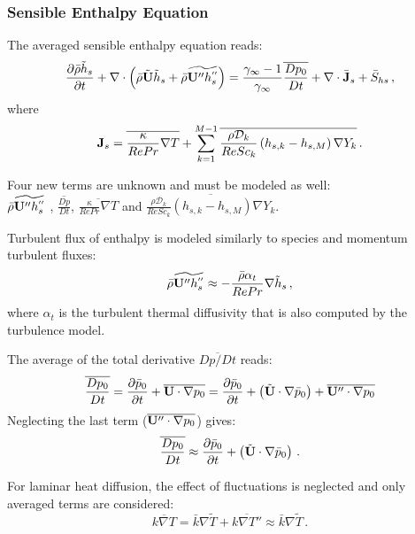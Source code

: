 \subsubsection{Sensible Enthalpy Equation}
The averaged sensible enthalpy equation reads:
\begin{equation}
\frac{\partial \bar{\rho} \tilde{h}_{s}}{\partial t} + \nabla \cdot
\left(\bar{\rho} \tilde{\mathbf{U}} \tilde{h}_{s} + \bar{\rho} \widetilde{\mathbf{U}''
h_s^{''}} \right) = \frac{\gamma_{\infty} -1}{\gamma_{\infty}}\overline{\frac{Dp_0}{Dt}} + \nabla
\cdot \bar{\mathbf{J}}_s + \bar{S}_{hs}\, ,
\end{equation} where 
\begin{equation}
\mathbf{J}_s =  \overline{\frac{\kappa}{Re Pr} \nabla T} + \sum_{k=1}^{M-1}
\overline{\frac{\rho\mathcal{D}_k}{Re Sc_k} \left( h_{s,k} -h_{s,M} \right)
\nabla Y_{k}} \, . 
\end{equation}

Four new terms are unknown and must be modeled as well:\\  $\bar{\rho}
\widetilde{\mathbf{U}'' h_s^{''}} $ , $\overline{\frac{Dp}{Dt}} $, 
$\overline{\frac{\kappa}{Re Pr} \nabla T}$ and 
$\overline{\frac{\rho\mathcal{D}_k}{Re Sc_k} \left( h_{s,k} -h_{s,M} \right)
\nabla Y_{k}} $.

Turbulent flux of enthalpy is modeled similarly to species and momentum
turbulent fluxes:
\begin{equation}
 \bar{\rho} \widetilde{\mathbf{U}'' h_s^{''}} \approx -\frac{\bar{\rho} \alpha_t
}{Re Pr} \nabla \tilde{h}_s \, ,
\end{equation}
where $\alpha_t$ is the turbulent thermal diffusivity that is also computed by the
turbulence model.

The average of the total derivative $\overline{Dp/Dt}$ reads:
\begin{equation}
 \overline{\frac{D p_0}{D t}} = \frac{\partial \bar{p}_0}{\partial
t}+\overline{\mathbf{U} \cdot \nabla p_0} = \frac{\partial \bar{p}_0}{\partial t} + \left( \tilde{\mathbf{U}} \cdot \nabla \bar{p}_0 \right) + \overline{\mathbf{U}'' \cdot \nabla p_0}
\end{equation}
Neglecting the last term ($\overline{\mathbf{U}'' \cdot \nabla p_0}$) gives:
\begin{equation}
 \overline{\frac{D p_0}{D t}}  \approx \frac{\partial \bar{p}_0}{\partial t} +
\left( \tilde{\mathbf{U}} \cdot \nabla \bar{p}_0 \right)\, .
\end{equation}

For laminar heat diffusion, the effect of fluctuations is neglected and only
averaged terms are considered:
\begin{equation}
 \overline{k \nabla T} = \bar{k} \nabla \tilde{T} + \overline{k\nabla T''}
\approx \bar{k} \nabla \tilde{T} \, .
\end{equation} 

